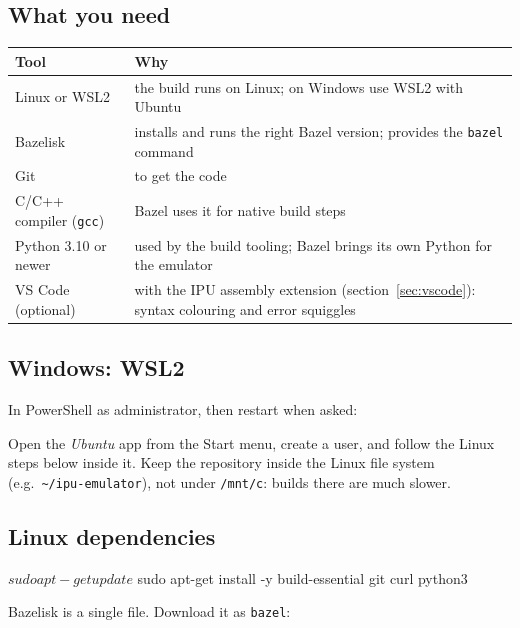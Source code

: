 \documentclass[11pt,a4paper]{article}
\begin{document}
\subsection{What you need}

\begin{center}
\begin{tabularx}{\linewidth}{lX}
\toprule
Tool & Why \\
\midrule
Linux or WSL2 & the build runs on Linux; on Windows use WSL2 with Ubuntu \\
Bazelisk & installs and runs the right Bazel version; provides the \texttt{bazel} command \\
Git & to get the code \\
C/C++ compiler (\texttt{gcc}) & Bazel uses it for native build steps \\
Python 3.10 or newer & used by the build tooling; Bazel brings its own Python for the emulator \\
VS Code (optional) & with the IPU assembly extension (section~\ref{sec:vscode}): syntax colouring and error squiggles \\
\bottomrule
\end{tabularx}
\end{center}

\subsection{Windows: WSL2}

In PowerShell as administrator, then restart when asked:


Open the \emph{Ubuntu} app from the Start menu, create a user, and follow the
Linux steps below inside it. Keep the repository inside the Linux file system
(e.g.\ \texttt{\textasciitilde/ipu-emulator}), not under \texttt{/mnt/c}: builds
there are much slower.

\subsection{Linux dependencies}

\begin{termcmd}
$ sudo apt-get update
$ sudo apt-get install -y build-essential git curl python3
\end{termcmd}

Bazelisk is a single file. Download it as \texttt{bazel}:
\end{document}
